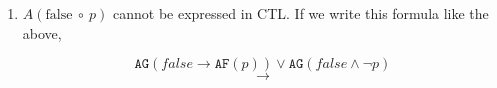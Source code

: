 \documentclass[11pt]{article}
\newcommand{\ax}[1]{\texttt{AX}(#1)}
\newcommand{\af}[1]{\texttt{AF}(#1)}
\newcommand{\ag}[1]{\texttt{AG}(#1)}
\begin{document}
\begin{enumerate}
\begin{enumerate}
\item $A(\mbox{false}\ \circ\ p)$ cannot be expressed in CTL. If we write this formula like the above,

$$\ag{false \rightarrow \af{p}} \lor \ag{false \land \neg p}$$
$$\rightarrow $$

\end{enumerate}










\end{enumerate}
\end{document}
